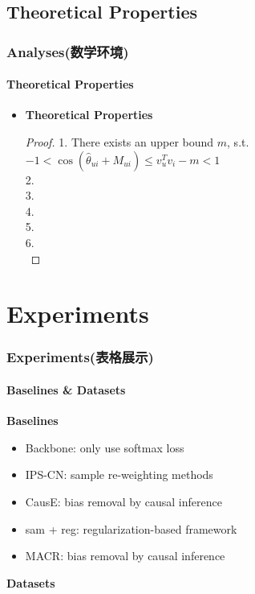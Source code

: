 \documentclass[aspectratio=169]{beamer}%
\begin{document}
{    \subsection{Theoretical Properties}
         \begin{frame}
            \frametitle{Analyses(数学环境)}
            \framesubtitle{Theoretical Properties}
            \begin{itemize}
            \item
            \textbf{Theoretical Properties}
            \begin{proof}
            1. There exists an upper bound $m$, s.t. $-1 < \cos(\hat{\theta}_{ui}+M_{ui}) \leq {v}_u^T{v}_i - m <  1 $\\
            2. \\
            3. \\
            4. \\
            5. \\
            6. \\

            \end{proof}
            \end{itemize}
        \end{frame}

\section{Experiments}  
\begin{frame}
    	\frametitle{Experiments(表格展示)}
         \framesubtitle{Baselines \& Datasets}
         \textbf{Baselines}
         \begin{itemize}
         \item
            Backbone: only use softmax loss
            \item
            IPS-CN: sample re-weighting methods
            \item
            CausE: bias removal by causal inference
            \item
            sam + reg: regularization-based framework
            \item
            MACR: bias removal by causal inference
        \end{itemize}
        \textbf{Datasets}
    \end{frame}

}
\end{document}
